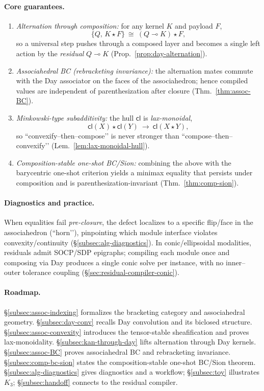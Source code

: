 \documentclass[11pt]{article}
\numberwithin{equation}{section}
\theoremstyle{upright}
\begin{document}
\paragraph{Core guarantees.}
\begin{enumerate}[leftmargin=*, itemsep=.35ex]
\item \emph{Alternation through composition:} for any kernel $K$ and payload $F$,
\[
\{Q,\,K\star F\}\ \cong\ (Q\multimap K)\star F,
\]
so a universal step pushes through a composed layer and becomes a single left action by the
\emph{residual} $Q\multimap K$ (Prop.~\ref{prop:day-alternation}).
\item \emph{Associahedral BC (rebracketing invariance):} the alternation mates commute with the
Day associator on the faces of the associahedron; hence compiled values are independent of
parenthesization after closure (Thm.~\ref{thm:assoc-BC}).
\item \emph{Minkowski-type subadditivity:} the hull $\mathsf{cl}$ is \emph{lax-monoidal},
\[
\mathsf{cl}(X)\star\mathsf{cl}(Y)\ \longrightarrow\ \mathsf{cl}(X\star Y),
\]
so “convexify–then–compose’’ is never stronger than “compose–then–convexify’’
(Lem.~\ref{lem:lax-monoidal-hull}).
\item \emph{Composition-stable one-shot BC/Sion:} combining the above with the barycentric
one-shot criterion yields a minimax equality that persists under composition and is
parenthesization-invariant (Thm.~\ref{thm:comp-sion}).
\end{enumerate}

\paragraph{Diagnostics and practice.}
When equalities fail \emph{pre-closure}, the defect localizes to a specific flip/face in the
associahedron (“horn’’), pinpointing which module interface violates convexity/continuity
(\S\ref{subsec:alg-diagnostics}). In conic/ellipsoidal modalities, residuals admit SOCP/SDP
epigraphs; compiling each module once and composing via Day produces a single conic solve per
instance, with no inner–outer tolerance coupling (\S\ref{sec:residual-compiler-conic}).

\paragraph{Roadmap.}
\S\ref{subsec:assoc-indexing} formalizes the bracketing category and associahedral geometry.
\S\ref{subsec:day-conv} recalls Day convolution and its biclosed structure. \S\ref{subsec:assoc-convexity}
introduces the tensor-stable sheafification and proves lax-monoidality. \S\ref{subsec:kan-through-day}
lifts alternation through Day kernels. \S\ref{subsec:assoc-BC} proves associahedral BC and rebracketing
invariance. \S\ref{subsec:comp-bc-sion} states the composition-stable one-shot BC/Sion theorem.
\S\ref{subsec:alg-diagnostics} gives diagnostics and a workflow; \S\ref{subsec:toy} illustrates $K_3$;
\S\ref{subsec:handoff} connects to the residual compiler.
\end{document}
